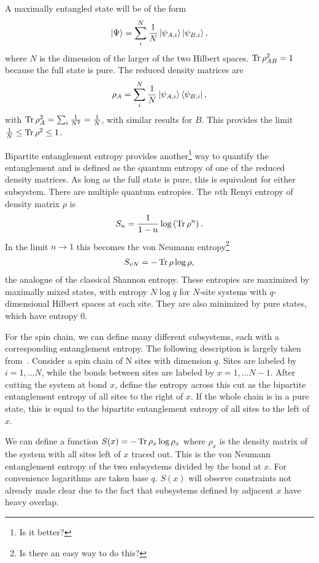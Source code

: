 A maximally entangled state will be of the form
\begin{align}
\left|\Psi\right\rangle = \sum_i^N\frac{1}{N}\left|\psi_{A,i}\right\rangle\left|\psi_{B,i}\right\rangle,
\end{align}
where $N$ is the dimension of the larger of the two Hilbert spaces. $\operatorname{Tr}\rho_{AB}^2=1$ because the full state is pure. The reduced density matrices are
\begin{align}
\rho_A = \sum_i^N\frac{1}{N}\left|\psi_{A,i}\right\rangle\left\langle\psi_{B,i}\right|,
\end{align}
with $\operatorname{Tr}\rho_A^2 = \sum_i\frac{1}{N^2}=\frac{1}{N}$, with similar results for $B$. This provides the limit $\frac{1}{N}\le\operatorname{Tr}\rho^2\le 1$. 

Bipartite entanglement entropy provides another\footnote{Is it better?} way to quantify the entanglement and is defined as the quantum entropy of one of the reduced density matrices. As long as the full state is pure, this is equivalent for either subsystem. There are multiple quantum entropies. The $n$th Renyi entropy of density matrix $\rho$ is 
\begin{align}
S_n = \frac{1}{1-n}\log\left(\operatorname{Tr}\rho^n\right). \label{eqn:renyi}
\end{align}
In the limit $n\to1$ this becomes the von Neumann entropy\footnote{Is there an easy way to do this?}
\begin{align}
S_{vN} = -\operatorname{Tr}\rho\log\rho,
\end{align}
the analogue of the classical Shannon entropy. These entropies are maximized by maximally mixed states, with entropy $N\log q$ for $N$-site systems with $q$-dimensional Hilbert spaces at each site. They are also minimized by pure states, which have entropy 0.

For the spin chain, we can define many different subsystems, each with a corresponding entanglement entropy. The following description is largely taken from~\cite{Nahum2017}. Consider a spin chain of N sites with dimension $q$. Sites are labeled by $i=1,\dots N$, while the bonds between sites are labeled by $x = 1,\dots N-1$. After cutting the system at bond $x$, define the entropy across this cut as the bipartite entanglement entropy of all sites to the right of $x$. If the whole chain is in a pure state, this is equal to the bipartite entanglement entropy of all sites to the left of $x$.

We can define a function $S(x) = -\operatorname{Tr}\rho_x\log\rho_x$ where $\rho_x$ is the density matrix of the system with all sites left of $x$ traced out. This is the von Neumann entanglement entropy of the two subsystems divided by the bond at $x$. For convenience logarithms are taken base $q$. $S(x)$ will observe constraints not already made clear due to the fact that subsystems defined by adjacent $x$ have heavy overlap.

